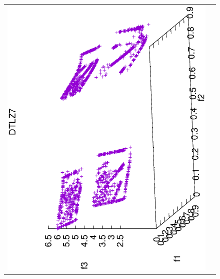 \begin{figure}[H]
\begin{tabular}{cc}
 \includegraphics[scale=0.3, angle=-90,origin=c]{Figures_Chapter7/Results_Chapter4/Summary_Representative/VSD-MOEA/DTLZ7.eps} &

\end{tabular}
\end{figure}
